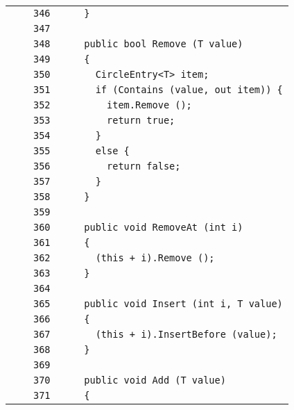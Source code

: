 \documentclass[a4paper,10pt]{article}
\begin{document}
\begin{longtable}[l]{lrrl}
\cellcolor{gray} &  & \verb~346~ & \verb~    }~\\
\cellcolor{gray} &  & \verb~347~ & \verb~~\\
\cellcolor{gray} &  & \verb~348~ & \verb~    public bool Remove (T value)~\\
\cellcolor{gray} &  & \verb~349~ & \verb~    {~\\
\cellcolor{gray} &  & \verb~350~ & \verb~      CircleEntry<T> item;~\\
\cellcolor{gray} &  & \verb~351~ & \verb~      if (Contains (value, out item)) {~\\
\cellcolor{gray} &  & \verb~352~ & \verb~        item.Remove ();~\\
\cellcolor{gray} &  & \verb~353~ & \verb~        return true;~\\
\cellcolor{gray} &  & \verb~354~ & \verb~      }~\\
\cellcolor{gray} &  & \verb~355~ & \verb~      else {~\\
\cellcolor{gray} &  & \verb~356~ & \verb~        return false;~\\
\cellcolor{gray} &  & \verb~357~ & \verb~      }~\\
\cellcolor{gray} &  & \verb~358~ & \verb~    }~\\
\cellcolor{gray} &  & \verb~359~ & \verb~~\\
\cellcolor{gray} &  & \verb~360~ & \verb~    public void RemoveAt (int i)~\\
\cellcolor{gray} &  & \verb~361~ & \verb~    {~\\
\cellcolor{gray} &  & \verb~362~ & \verb~      (this + i).Remove ();~\\
\cellcolor{gray} &  & \verb~363~ & \verb~    }~\\
\cellcolor{gray} &  & \verb~364~ & \verb~~\\
\cellcolor{gray} &  & \verb~365~ & \verb~    public void Insert (int i, T value)~\\
\cellcolor{gray} &  & \verb~366~ & \verb~    {~\\
\cellcolor{gray} &  & \verb~367~ & \verb~      (this + i).InsertBefore (value);~\\
\cellcolor{gray} &  & \verb~368~ & \verb~    }~\\
\cellcolor{gray} &  & \verb~369~ & \verb~~\\
\cellcolor{gray} &  & \verb~370~ & \verb~    public void Add (T value)~\\
\cellcolor{gray} &  & \verb~371~ & \verb~    {~\\

\end{longtable}
\end{document}

